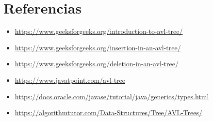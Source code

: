 \documentclass{article}
\begin{document}
\clearpage

\section{Referencias}
\begin{itemize}			
	\item \url{https://www.geeksforgeeks.org/introduction-to-avl-tree/}
	\item \url{https://www.geeksforgeeks.org/insertion-in-an-avl-tree/}
	\item \url{https://www.geeksforgeeks.org/deletion-in-an-avl-tree/}
	\item \url{https://www.javatpoint.com/avl-tree}
	\item \url{https://docs.oracle.com/javase/tutorial/java/generics/types.html}
	\item \url{https://algorithmtutor.com/Data-Structures/Tree/AVL-Trees/}
\end{itemize}	
	
%
%
%
			
\end{document}
